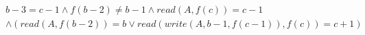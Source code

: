 \begin{align*}
%
& %
b - 3 = c - 1
%
\land
%
f(b - 2)  \neq  b - 1
%
\land
%
\mathit{read}(A,f(c)) = c - 1
~\\~
& %
%
\land
%
(\mathit{read}(A,f(b - 2)) = b \lor \mathit{read}(\mathit{write}(A,b - 1,f(c - 1)),f(c)) = c + 1)
%
\end{align*}
